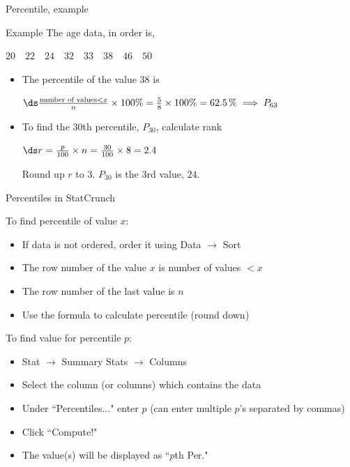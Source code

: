 \documentclass[xcolor=table]{beamer}
\begin{document}
\begin{frame}{Percentile, example}
\begin{exampleblock}{Example}
The age data, in order is, \\
\smallskip
{\centering
$20 \quad 22 \quad 24 \quad 32 \quad 33 \quad 38 \quad 46 \quad 50$
\par}

\begin{itemize}
\pause
\item The percentile of the value 38 is\\
\medskip
{\centering
$\ds \frac{\text{number of values} < x}{n} \times 100\% = \frac{5}{8} \times 100\% = 62.5 \,\% \implies P_{63}$
\par} 
\medskip
\pause\item To find the 30th percentile, $P_{30}$, calculate rank\\
\medskip
{\centering
$\ds r= \frac {p}{100} \times n = \frac {30}{100} \times 8 = 2.4 $
\par}
\medskip
Round up $r$ to $3$. $P_{30}$ is the 3rd value, $24$.
\end{itemize}
\end{exampleblock}
\end{frame}

\begin{frame}{Percentiles in StatCrunch}
\begin{block}{}
To find percentile of value $x$:
\begin{itemize}
\item If data is not ordered, order it using Data $\to$ Sort
\item The row number of the value  $x$ is number of values $< x$
\item The row number of the last value is $n$
\item Use the formula to calculate percentile (round down)
\end{itemize}
To find value for percentile $p$:
\begin{itemize}
\item Stat $\to$ Summary Stats $\to$ Columns
\item Select the column (or columns) which contains the data
\item Under ``Percentiles..." enter $p$ (can enter multiple $p$'s separated by commas)
\item Click ``Compute!"
\item The value(s) will be displayed as ``$p$th Per."
\end{itemize}
\end{block}
\end{frame}
\end{document}
